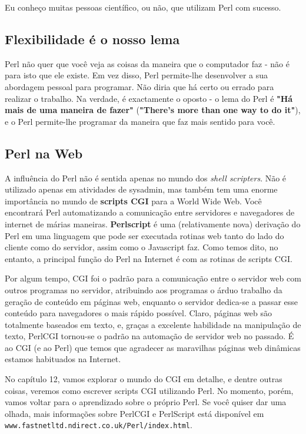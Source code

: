 \documentclass[a4paper,11pt]{book}
\begin{document}
\noindent Eu conheço muitas pessoas científico, ou não, que utilizam Perl com sucesso.

\subsection{Flexibilidade é o nosso lema}

\noindent Perl não quer que você veja as coisas da maneira que o computador faz - não é para isto que ele existe. Em vez disso, Perl permite-lhe desenvolver a sua abordagem pessoal para programar. Não diria que há certo ou errado para realizar o trabalho. Na verdade, é exactamente o oposto - o lema do Perl é \textbf{"Há mais de uma maneira de fazer"} (\textbf{"There's more than one way to do it"}), e o Perl permite-lhe programar da maneira que faz mais sentido para você.

\subsection{Perl na Web}

\noindent A influência do Perl não é sentida apenas no mundo dos \textit{shell scripters}. Não é utilizado apenas em atividades de sysadmin, mas também tem uma enorme importância no mundo de \textbf{scripts CGI} para a World Wide Web. Você encontrará Perl automatizando a comunicação entre servidores e navegadores de internet de márias maneiras. \textbf{Perlscript} é uma (relativamente nova) derivação do Perl em uma linguagem que pode ser executada rotinas web tanto do lado do cliente como do servidor, assim como o Javascript faz. Como temos dito, no entanto, a principal função do Perl na Internet é com as rotinas de scripts CGI.

\noindent Por algum tempo, CGI foi o padrão para a comunicação entre o servidor web com outros programas no servidor, atribuindo aos programas o árduo trabalho da geração de conteúdo em páginas web, enquanto o servidor dedica-se a passar esse conteúdo para navegadores o mais rápido possível. Claro, páginas web são totalmente baseados em texto, e, graças a excelente habilidade na manipulação de texto, PerlCGI tornou-se o padrão na automação de servidor web no passado. É ao CGI (e ao Perl) que temos que agradecer as maravilhas páginas web dinâmicas estamos habituados na Internet.

\noindent No capítulo 12, vamos explorar o mundo do CGI em detalhe, e dentre outras coisas, veremos como escrever scripts CGI utilizando Perl. No momento, porém, vamos voltar para o aprendizado sobre o próprio Perl. Se você quiser dar uma olhada, mais informações sobre PerlCGI e PerlScript está disponível em \texttt{www.fastnetltd.ndirect.co.uk/Perl/index.html}.
\end{document}
